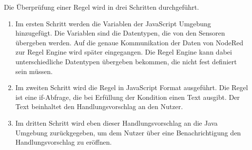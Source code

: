 Die Überprüfung einer Regel wird in drei Schritten durchgeführt.
\begin{enumerate}
\item Im ersten Schritt werden die Variablen der JavaScript Umgebung hinzugefügt. Die Variablen sind die Datentypen, die von den Sensoren übergeben werden. Auf die genaue Kommunikation der Daten von NodeRed zur Regel Engine wird später eingegangen. Die Regel Engine kann dabei unterschiedliche Datentypen übergeben bekommen, die nicht fest definiert sein müssen. 
\item Im zweiten Schritt wird die Regel in JavaScript Format ausgeführt. Die Regel ist eine if-Abfrage, die bei Erfüllung der Kondition einen Text ausgibt. Der Text beinhaltet den Handlungsvorschlag an den Nutzer.
\item Im dritten Schritt wird eben dieser Handlungsvorschlag an die Java Umgebung zurückgegeben, um dem Nutzer über eine Benachrichtigung den Handlungsvorschlag zu eröffnen.
\end{enumerate}

